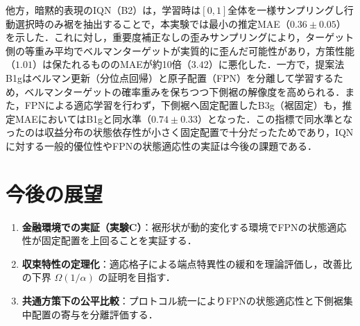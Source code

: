 \documentclass[a4paper,twocolumn,10pt]{jsarticle}
\newcommand{\CVaR}{\mathrm{CVaR}}
\begin{document}
\newpage


\begin{table}[t]
\centering
\vspace{-2pt}
\setlength{\tabcolsep}{2.5pt}
\caption{実験Bの性能比較（3シード平均$\pm$SD）．推定MAEは獲得方策下の$\CVaR_{0.05}$推定誤差，経験CVaRは5,000エピソードの実収益から計算．裾点数は15個の内部 quantile fraction中$[0,\alpha]$に入る数（IQNは連続サンプリングのため---）．}
\label{tab:expB}
\vspace{-2pt}
\end{table}

他方，暗黙的表現のIQN（B2）は，学習時は$[0,1]$全体を一様サンプリングし行動選択時のみ裾を抽出することで，本実験では最小の推定MAE（$0.36\pm0.05$）を示した．これに対し，重要度補正なしの歪みサンプリングにより，ターゲット側の等重み平均でベルマンターゲットが実質的に歪んだ可能性があり，方策性能（$1.01$）は保たれるもののMAEが約10倍（$3.42$）に悪化した．一方で，提案法B1gはベルマン更新（分位点回帰）と原子配置（FPN）を分離して学習するため，ベルマンターゲットの確率重みを保ちつつ下側裾の解像度を高められる．また，FPNによる適応学習を行わず，下側裾へ固定配置したB3g（裾固定）も，推定MAEにおいてはB1gと同水準（$0.74\pm0.33$）となった．この指標で同水準となったのは収益分布の状態依存性が小さく固定配置で十分だったためであり，IQNに対する一般的優位性やFPNの状態適応性の実証は今後の課題である．

\section{今後の展望}
\vspace{-2pt}
\begin{enumerate}
\setlength{\topsep}{0pt}
\setlength{\itemsep}{-1pt}
\setlength{\parskip}{0pt}
\setlength{\parsep}{0pt}
\item \textbf{金融環境での実証（実験C）}：裾形状が動的変化する環境でFPNの状態適応性が固定配置を上回ることを実証する．
\item \textbf{収束特性の定理化}：適応格子による端点特異性の緩和を理論評価し，改善比の下界 $\Omega(1/\alpha)$ の証明を目指す．
\item \textbf{共通方策下の公平比較}：プロトコル統一によりFPNの状態適応性と下側裾集中配置の寄与を分離評価する．
\end{enumerate}
\vspace{-2pt}
\end{document}
